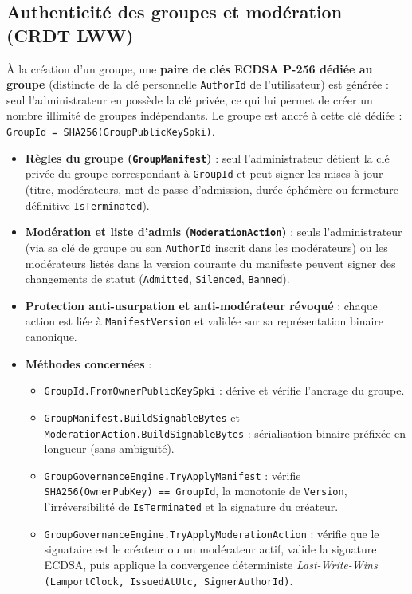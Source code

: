 \documentclass[11pt,a4paper]{article}
\begin{document}
\subsection{Authenticité des groupes et modération (CRDT LWW)}
À la création d'un groupe, une \textbf{paire de clés ECDSA P-256 dédiée au groupe} (distincte de la clé personnelle \texttt{AuthorId} de l'utilisateur) est générée : seul l'administrateur en possède la clé privée, ce qui lui permet de créer un nombre illimité de groupes indépendants. Le groupe est ancré à cette clé dédiée : \texttt{GroupId = SHA256(GroupPublicKeySpki)}.
\begin{itemize}
    \item \textbf{Règles du groupe (\texttt{GroupManifest})} : seul l'administrateur détient la clé privée du groupe correspondant à \texttt{GroupId} et peut signer les mises à jour (titre, modérateurs, mot de passe d'admission, durée éphémère ou fermeture définitive \texttt{IsTerminated}).
    \item \textbf{Modération et liste d'admis (\texttt{ModerationAction})} : seuls l'administrateur (via sa clé de groupe ou son \texttt{AuthorId} inscrit dans les modérateurs) ou les modérateurs listés dans la version courante du manifeste peuvent signer des changements de statut (\texttt{Admitted}, \texttt{Silenced}, \texttt{Banned}).
    \item \textbf{Protection anti-usurpation et anti-modérateur révoqué} : chaque action est liée à \texttt{ManifestVersion} et validée sur sa représentation binaire canonique.
    \item \textbf{Méthodes concernées} :
    \begin{itemize}
        \item \texttt{GroupId.FromOwnerPublicKeySpki} : dérive et vérifie l'ancrage du groupe.
        \item \texttt{GroupManifest.BuildSignableBytes} et \texttt{ModerationAction.BuildSignableBytes} : sérialisation binaire préfixée en longueur (sans ambiguïté).
        \item \texttt{GroupGovernanceEngine.TryApplyManifest} : vérifie \texttt{SHA256(OwnerPubKey) == GroupId}, la monotonie de \texttt{Version}, l'irréversibilité de \texttt{IsTerminated} et la signature du créateur.
        \item \texttt{GroupGovernanceEngine.TryApplyModerationAction} : vérifie que le signataire est le créateur ou un modérateur actif, valide la signature ECDSA, puis applique la convergence déterministe \emph{Last-Write-Wins} \texttt{(LamportClock, IssuedAtUtc, SignerAuthorId)}.

\end{itemize}
\end{itemize}
\end{document}
